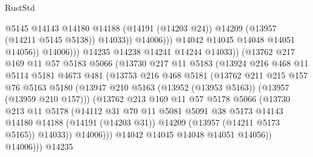 \begin{lexlean}{RustStd}
\begin{coremodule}
                                    @5145
                                    @14143
                                    @14180
                                    @14188
                                    (@14191 (@14203 @24))
                                    @14209
                                    (@13957 (@14211 @5145 @5138))
                                    @14033))
                                @14006)))
                          @14042
                          @14045
                          @14048
                          @14051
                          @14056))
                      @14006)))
                @14235
                @14238
                @14241
                @14244
                @14033))
            (@13762
              @217
              @169
              @11
              @57
              @5183
              @5066
              (@13730
                @217
                @11
                @5183
                (@13924
                  @216
                  @468
                  @11
                  @5114
                  @5181
                  @4673
                  @481
                  (@13753
                    @216
                    @468
                    @5181
                    (@13762
                      @211
                      @215
                      @157
                      @76
                      @5163
                      @5180
                      (@13947 @210 @5163 (@13952 (@13953 @5163)) (@13957 (@13959 @210 @157)))
                      (@13762
                        @213
                        @169
                        @11
                        @57
                        @5178
                        @5066
                        (@13730
                          @213
                          @11
                          @5178
                          (@14112
                            @31
                            @70
                            @11
                            @5081
                            @5091
                            @38
                            @5173
                            @14143
                            @14180
                            @14188
                            (@14191 (@14203 @31))
                            @14209
                            (@13957 (@14211 @5173 @5165))
                            @14033))
                        @14006)))
                  @14042
                  @14045
                  @14048
                  @14051
                  @14056))
              @14006)))
        @14235

\end{coremodule}
\end{lexlean}
